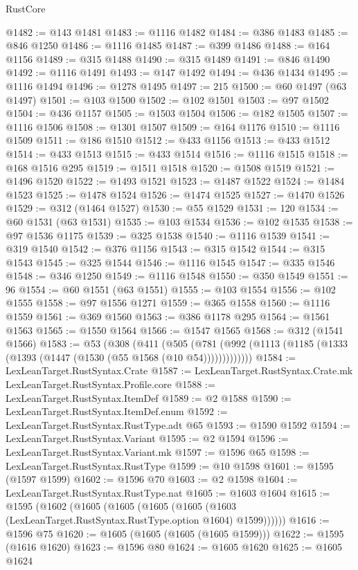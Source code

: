 \begin{lexlean}{RustCore}
\begin{coremodule}
@1482 := @143 @1481
@1483 := @1116 @1482
@1484 := @386 @1483
@1485 := @846 @1250
@1486 := @1116 @1485
@1487 := @399 @1486
@1488 := @164 @1156
@1489 := @315 @1488
@1490 := @315 @1489
@1491 := @846 @1490
@1492 := @1116 @1491
@1493 := @147 @1492
@1494 := @436 @1434
@1495 := @1116 @1494
@1496 := @1278 @1495
@1497 := 215
@1500 := @60 @1497 (@63 @1497)
@1501 := @103 @1500
@1502 := @102 @1501
@1503 := @97 @1502
@1504 := @436 @1157
@1505 := @1503 @1504
@1506 := @182 @1505
@1507 := @1116 @1506
@1508 := @1301 @1507
@1509 := @164 @1176
@1510 := @1116 @1509
@1511 := @186 @1510
@1512 := @433 @1156
@1513 := @433 @1512
@1514 := @433 @1513
@1515 := @433 @1514
@1516 := @1116 @1515
@1518 := @168 @1516 @295
@1519 := @1511 @1518
@1520 := @1508 @1519
@1521 := @1496 @1520
@1522 := @1493 @1521
@1523 := @1487 @1522
@1524 := @1484 @1523
@1525 := @1478 @1524
@1526 := @1474 @1525
@1527 := @1470 @1526
@1529 := @312 (@1464 @1527)
@1530 := @55 @1529
@1531 := 120
@1534 := @60 @1531 (@63 @1531)
@1535 := @103 @1534
@1536 := @102 @1535
@1538 := @97 @1536 @1175
@1539 := @325 @1538
@1540 := @1116 @1539
@1541 := @319 @1540
@1542 := @376 @1156
@1543 := @315 @1542
@1544 := @315 @1543
@1545 := @325 @1544
@1546 := @1116 @1545
@1547 := @335 @1546
@1548 := @346 @1250
@1549 := @1116 @1548
@1550 := @350 @1549
@1551 := 96
@1554 := @60 @1551 (@63 @1551)
@1555 := @103 @1554
@1556 := @102 @1555
@1558 := @97 @1556 @1271
@1559 := @365 @1558
@1560 := @1116 @1559
@1561 := @369 @1560
@1563 := @386 @1178 @295
@1564 := @1561 @1563
@1565 := @1550 @1564
@1566 := @1547 @1565
@1568 := @312 (@1541 @1566)
@1583 := @53
    (@308
      (@411
        (@505 (@781 (@992 (@1113 (@1185 (@1333 (@1393 (@1447 (@1530 (@55 @1568 (@10 @54)))))))))))))
@1584 := LexLeanTarget.RustSyntax.Crate
@1587 := LexLeanTarget.RustSyntax.Crate.mk LexLeanTarget.RustSyntax.Profile.core
@1588 := LexLeanTarget.RustSyntax.ItemDef
@1589 := @2 @1588
@1590 := LexLeanTarget.RustSyntax.ItemDef.enum
@1592 := LexLeanTarget.RustSyntax.RustType.adt @65
@1593 := @1590 @1592
@1594 := LexLeanTarget.RustSyntax.Variant
@1595 := @2 @1594
@1596 := LexLeanTarget.RustSyntax.Variant.mk
@1597 := @1596 @65
@1598 := LexLeanTarget.RustSyntax.RustType
@1599 := @10 @1598
@1601 := @1595 (@1597 @1599)
@1602 := @1596 @70
@1603 := @2 @1598
@1604 := LexLeanTarget.RustSyntax.RustType.nat
@1605 := @1603 @1604
@1615 := @1595
    (@1602
      (@1605
        (@1605 (@1605 (@1605 (@1603 (LexLeanTarget.RustSyntax.RustType.option @1604) @1599))))))
@1616 := @1596 @75
@1620 := @1605 (@1605 (@1605 (@1605 @1599)))
@1622 := @1595 (@1616 @1620)
@1623 := @1596 @80
@1624 := @1605 @1620
@1625 := @1605 @1624

\end{coremodule}
\end{lexlean}
